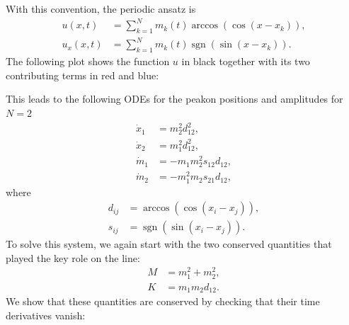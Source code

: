 \documentclass[english,master]{liumaiex}
\theoremstyle{thesisplain}
\theoremstyle{thesisdefinition}
\DeclareMathOperator{\sgn}{sgn}
\numberwithin{equation}{section}
\begin{document}
With this convention, the periodic ansatz is
\begin{equation} \label{eq:periodic_ansatz}
\begin{aligned}
    u(x, t) &= \sum_{k = 1}^{N} m_k(t) \arccos(\cos(x-x_k)), \\
    u_x(x, t) &= \sum_{k = 1}^{N} m_k(t) \sgn(\sin(x-x_k)).
\end{aligned}
\end{equation}
%
The following plot shows the function $u$ in black together with its two contributing terms in red and blue:
\begin{center}
\end{center}
%
This leads to the following ODEs for the peakon positions and amplitudes for $N=2$
%
\begin{align}
    \dot{x}_1 & = m_2^2 d_{12}^2, \\
    \dot{x}_2 & = m_1^2 d_{12}^2, \\
    \dot{m}_1 & = -m_1 m_2^2 s_{12} d_{12},  \\
    \dot{m}_2 & = -m_1^2 m_2 s_{21} d_{12},
\end{align}
where
\begin{align}
	d_{ij} &= \arccos(\cos(x_i - x_j)), \\
	s_{ij} &= \sgn(\sin(x_i - x_j)).
\end{align}
%
To solve this system, we again start with the two conserved quantities that played the key role on the line:
\begin{align}
    M &= m_1^2 + m_2^2, \\
    K &= m_1m_2 d_{12}.
\end{align}
%
We show that these quantities are conserved by checking that their time derivatives vanish:
\end{document}
